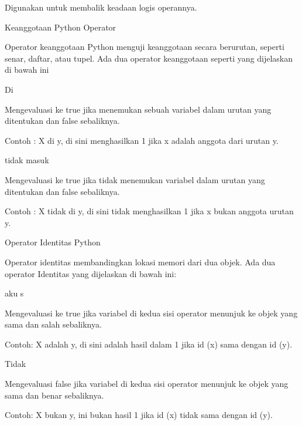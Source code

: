\vspace{12pt}
\noindent
Digunakan untuk membalik keadaan logis operannya. \par
\vspace{12pt}
\noindent
Keanggotaan Python Operator \par
\vspace{12pt}
\noindent
Operator keanggotaan Python menguji keanggotaan secara berurutan, seperti senar, daftar, atau tupel. $  $Ada dua operator keanggotaan seperti yang dijelaskan di bawah ini \par
\vspace{12pt}
\noindent
Di \par
\noindent
Mengevaluasi ke true jika menemukan sebuah variabel dalam urutan yang ditentukan dan false sebaliknya. \par
\noindent
Contoh : X di y, di sini menghasilkan 1 jika x adalah anggota dari urutan y. \par
\vspace{12pt}
\noindent
tidak masuk \par
\noindent
Mengevaluasi ke true jika tidak menemukan variabel dalam urutan yang ditentukan dan false sebaliknya. \par
\noindent
Contoh : X tidak di y, di sini tidak menghasilkan 1 jika x bukan anggota urutan y. \par
\vspace{12pt}
\noindent
Operator Identitas Python \par
\vspace{12pt}
\noindent
Operator identitas membandingkan lokasi memori dari dua objek. $  $Ada dua operator Identitas yang dijelaskan di bawah ini: \par
\vspace{12pt}
\noindent
aku s \par
\noindent
Mengevaluasi ke true jika variabel di kedua sisi operator menunjuk ke objek yang sama dan salah sebaliknya. \par
\noindent
Contoh: X adalah y, di sini $  $adalah $  $hasil dalam 1 jika id (x) sama dengan id (y). \par
\vspace{12pt}
\noindent
Tidak \par
\noindent
Mengevaluasi false jika variabel di kedua sisi operator menunjuk ke objek yang sama dan benar sebaliknya. \par
\noindent
Contoh: X bukan y, $  $ini bukan $  $hasil 1 jika id (x) tidak sama dengan id (y). \par
\vspace{12pt}
